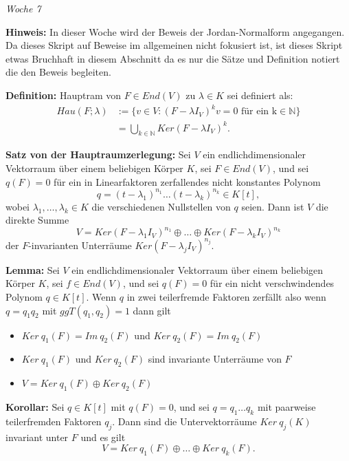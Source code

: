 \documentclass{article}
\begin{document}
\textit{\small \hspace{-1.5cm}Woche 7}

\textbf{Hinweis:} In dieser Woche wird der Beweis der Jordan-Normalform
angegangen. Da dieses Skript auf Beweise im allgemeinen nicht fokusiert ist,
ist dieses Skript etwas Bruchhaft in diesem Abschnitt da es nur die Sätze und
Definition notiert die den Beweis begleiten.

\textbf{Definition:} Hauptram von $F\in End(V)$ zu $\lambda\in K$ sei definiert
als:
\begin{align*}
	Hau(F;\lambda) &:=\{v\in V:(F-\lambda I_V)^kv=0\text{ für ein
	k}\in\mathbb{N}\}\\
	&= \mathop{\bigcup}_{k\in\mathbb{N}}Ker(F-\lambda I_V)^k.
\end{align*}

\textbf{Satz von der Hauptraumzerlegung:} Sei $V$ ein endlichdimensionaler
Vektorraum über einem beliebigen Körper $K$, sei $F\in End(V)$, und sei
$q(F)=0$ für ein in Linearfaktoren zerfallendes nicht konstantes Polynom
\begin{equation*}
q=(t-\lambda_1)^{n_1}\dots(t-\lambda_k)^{n_k}\in K[t],
\end{equation*}
wobei $\lambda_1,\dots,\lambda_k\in K$ die verschiedenen Nullstellen von $q$
seien. Dann ist $V$ die direkte Summe
\begin{equation*}
V=Ker(F-\lambda_1 I_V)^{n_1}\oplus\dots\oplus Ker(F-\lambda_k I_V)^{n_k}
\end{equation*}
der $F$-invarianten Unterräume $Ker(F-\lambda_j I_V)^{n_j}$.

\newpage
\textbf{Lemma:} Sei $V$ ein endlichdimensionaler Vektorraum über einem
beliebigen Körper $K$, sei $f\in End(V)$, und sei $q(F)=0$ für ein nicht
verschwindendes Polynom $q\in K[t]$. Wenn $q$ in zwei teilerfremde Faktoren
zerfällt also wenn $q=q_1q_2$ mit $ggT(q_1,q_2)=1$ dann gilt

\begin{itemize}
\item[i)] $Ker\ q_1(F) = Im\ q_2(F)$ und $Ker\ q_2(F)=Im\ q_2(F)$
\item[ii)] $Ker\ q_1(F)$ und $Ker\ q_2(F)$ sind invariante Unterräume von $F$
\item[iii)] $V=Ker\ q_1(F)\oplus Ker\ q_2(F)$
\end{itemize}

\textbf{Korollar:} Sei $q\in K[t]$ mit $q(F)=0$, und sei $q=q_1\dots q_k$ mit
paarweise teilerfremden Faktoren $q_j$. Dann sind die Untervektorräume $Ker\
q_j(K)$ invariant unter $F$ und es gilt 
\begin{equation*}
	V=Ker\ q_1(F)\oplus\dots\oplus Ker\ q_k(F).
\end{equation*}
\end{document}
